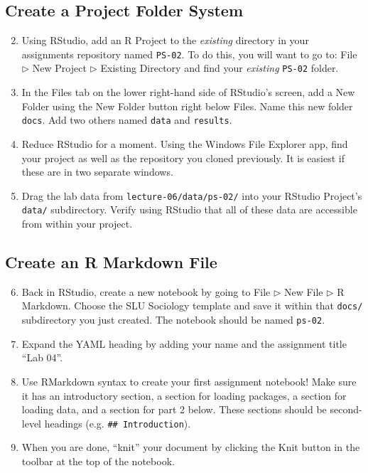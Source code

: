 \documentclass{tufte-handout}
\begin{document}
\subsection{Create a Project Folder System}
\begin{enumerate}[label=\alph*.]
\setcounter{enumi}{1}
\item Using RStudio, add an R Project to the \textit{existing} directory in your assignments repository named \texttt{PS-02}. To do this, you will want to go to: \textsf{File $\triangleright$} {\color{red}\textsf{New Project}} \textsf{$\triangleright$ Existing Directory} and find your \textit{existing} \texttt{PS-02} folder.
\item In the \textsf{Files} tab on the lower right-hand side of RStudio's screen, add a New Folder using the \textsf{New Folder} button right below \textsf{Files}. Name this new folder \texttt{docs}. Add two others named \texttt{data} and \texttt{results}.
\item Reduce RStudio for a moment. Using the Windows File Explorer app, find your project as well as the repository you cloned previously. It is easiest if these are in two separate windows.
\item Drag the lab data from \texttt{lecture-06/data/ps-02/} into your RStudio Project's \texttt{data/} subdirectory. Verify using RStudio that all of these data are accessible from within your project.
\end{enumerate}

\vspace{3mm}
\subsection{Create an R Markdown File}
\begin{enumerate}[label=\alph*.]
\setcounter{enumi}{5}
\item Back in RStudio, create a new notebook by going to \textsf{File $\triangleright$ New File $\triangleright$} {\color{red}\textsf{R Markdown}}. Choose the SLU Sociology template and save it within that \texttt{docs/} subdirectory you just created. The notebook should be named \texttt{ps-02}.
\item Expand the YAML heading by adding your name and the assignment title ``Lab 04''.
\item Use RMarkdown syntax to create your first assignment notebook! Make sure it has an introductory section, a section for loading packages, a section for loading data, and a section for part 2 below. These sections should be second-level headings (e.g. \texttt{\#\# Introduction}). 
\item When you are done, ``knit'' your document by clicking the \textsf{Knit} button in the toolbar at the top of the notebook.
\end{enumerate}
\end{document}
